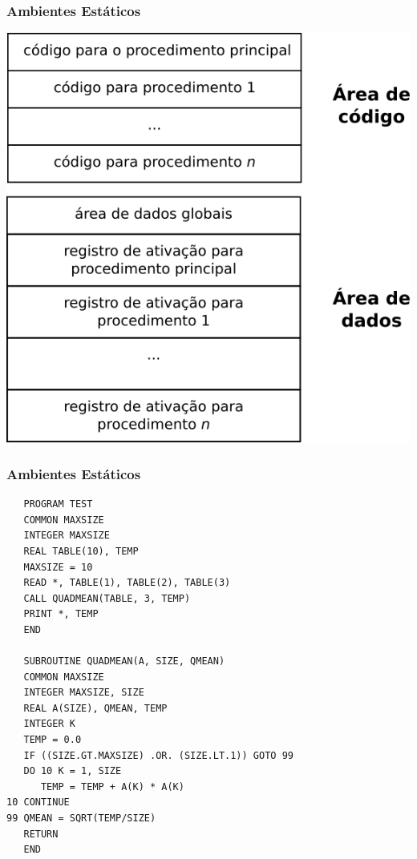 \documentclass[table]{beamer}
\begin{document}
\begin{frame}
   \frametitle{Ambientes Estáticos}
   \begin{center}
      \includegraphics[scale=0.4]{figuras/ambienteestatico.png}
   \end{center}
\end{frame}

\begin{frame}[fragile]
   \frametitle{Ambientes Estáticos}
   \scriptsize
   \begin{verbatim}
   PROGRAM TEST
   COMMON MAXSIZE
   INTEGER MAXSIZE
   REAL TABLE(10), TEMP
   MAXSIZE = 10
   READ *, TABLE(1), TABLE(2), TABLE(3)
   CALL QUADMEAN(TABLE, 3, TEMP)
   PRINT *, TEMP
   END
   
   SUBROUTINE QUADMEAN(A, SIZE, QMEAN)
   COMMON MAXSIZE
   INTEGER MAXSIZE, SIZE
   REAL A(SIZE), QMEAN, TEMP
   INTEGER K
   TEMP = 0.0
   IF ((SIZE.GT.MAXSIZE) .OR. (SIZE.LT.1)) GOTO 99
   DO 10 K = 1, SIZE
      TEMP = TEMP + A(K) * A(K)
10 CONTINUE
99 QMEAN = SQRT(TEMP/SIZE)
   RETURN
   END
   \end{verbatim}
\end{frame}
\end{document}
